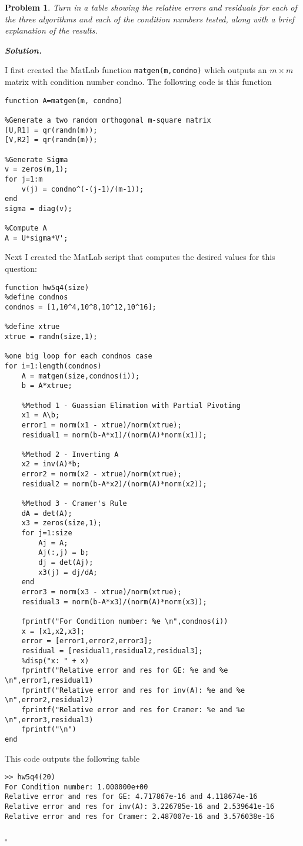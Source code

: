 \documentclass[12pt]{report}
\newtheorem{problem}{Problem}
\newenvironment{solution}[1][\it{Solution}]{\textbf{#1. } }{$\square$}
\begin{document}
\begin{problem}
Turn in a table showing the relative errors and residuals for each of the
three algorithms and each of the condition numbers tested, along with a
brief explanation of the results.

\end{problem}

\begin{solution}
    
    \noindent
    I first created the MatLab function \verb+matgen(m,condno)+ which  outputs an $m\times m$ matrix with condition number condno. The following code is this function
    \begin{verbatim}
function A=matgen(m, condno)

%Generate a two random orthogonal m-square matrix
[U,R1] = qr(randn(m));
[V,R2] = qr(randn(m));

%Generate Sigma
v = zeros(m,1);
for j=1:m
    v(j) = condno^(-(j-1)/(m-1));
end
sigma = diag(v);

%Compute A
A = U*sigma*V';
    \end{verbatim}
    Next I created the MatLab script that computes the desired values for this question:
    \begin{verbatim}
function hw5q4(size)
%define condnos
condnos = [1,10^4,10^8,10^12,10^16];

%define xtrue
xtrue = randn(size,1);

%one big loop for each condnos case
for i=1:length(condnos)
    A = matgen(size,condnos(i));
    b = A*xtrue;
    
    %Method 1 - Guassian Elimation with Partial Pivoting
    x1 = A\b;
    error1 = norm(x1 - xtrue)/norm(xtrue);
    residual1 = norm(b-A*x1)/(norm(A)*norm(x1));
    
    %Method 2 - Inverting A
    x2 = inv(A)*b;
    error2 = norm(x2 - xtrue)/norm(xtrue);
    residual2 = norm(b-A*x2)/(norm(A)*norm(x2));
    
    %Method 3 - Cramer's Rule
    dA = det(A);
    x3 = zeros(size,1);
    for j=1:size
        Aj = A;
        Aj(:,j) = b;
        dj = det(Aj);
        x3(j) = dj/dA;
    end
    error3 = norm(x3 - xtrue)/norm(xtrue);
    residual3 = norm(b-A*x3)/(norm(A)*norm(x3));
    
    fprintf("For Condition number: %e \n",condnos(i))
    x = [x1,x2,x3];
    error = [error1,error2,error3];
    residual = [residual1,residual2,residual3];
    %disp("x: " + x)
    fprintf("Relative error and res for GE: %e and %e \n",error1,residual1)
    fprintf("Relative error and res for inv(A): %e and %e \n",error2,residual2)
    fprintf("Relative error and res for Cramer: %e and %e \n",error3,residual3)
    fprintf("\n")
end
    \end{verbatim}
    This code outputs the following table
    \begin{verbatim}
>> hw5q4(20)
For Condition number: 1.000000e+00 
Relative error and res for GE: 4.717867e-16 and 4.118674e-16 
Relative error and res for inv(A): 3.226785e-16 and 2.539641e-16 
Relative error and res for Cramer: 2.487007e-16 and 3.576038e-16 


\end{verbatim}
\end{solution}
\end{document}
